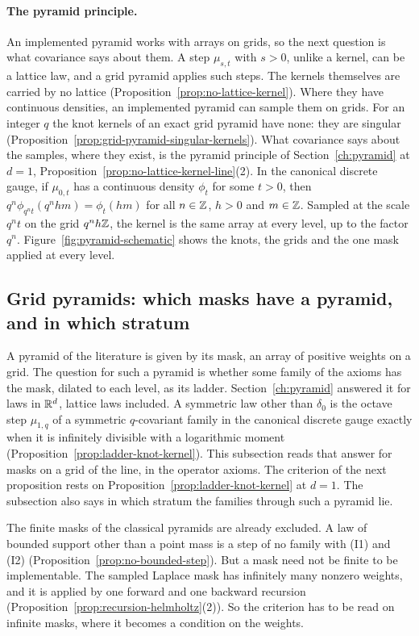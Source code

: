 \paragraph{The pyramid principle.} An implemented pyramid works with arrays on grids, so the next
question is what covariance says about them. A step $\mu_{s,t}$ with $s > 0$, unlike a kernel, can
be a lattice law, and a grid pyramid applies such steps. The kernels themselves are carried by no
lattice (Proposition~\ref{prop:no-lattice-kernel}). Where they have continuous densities, an
implemented pyramid can sample them on grids. For an integer $q$ the knot kernels of an exact grid
pyramid have none: they are singular (Proposition~\ref{prop:grid-pyramid-singular-kernels}).
What covariance says about the samples, where they exist, is the pyramid principle of
Section~\ref{ch:pyramid} at $d = 1$, Proposition~\ref{prop:no-lattice-kernel-line}(2). In the canonical discrete gauge, if $\mu_{0,t}$
has a continuous density $\phi_t$ for some $t > 0$, then $q^n\phi_{q^nt}(q^nhm) = \phi_t(hm)$ for
all $n \in \mathbb{Z}$, $h > 0$ and $m \in \mathbb{Z}$. Sampled at the scale $q^nt$ on the grid $q^nh\mathbb{Z}$, the
kernel is the same array at every level, up to the factor $q^n$.
Figure~\ref{fig:pyramid-schematic} shows the knots, the grids and the one mask applied at every
level.

\subsection{Grid pyramids: which masks have a pyramid, and in which stratum}
\label{subsec:grid-pyramids-line}

A pyramid of the literature is given by its mask, an array of positive weights on a grid. The
question for such a pyramid is whether some family of the axioms has the mask, dilated to each
level, as its ladder. Section~\ref{ch:pyramid} answered it for laws in $\mathbb{R}^d$, lattice laws
included. A symmetric law other than $\delta_0$ is the octave step $\mu_{1,q}$ of a symmetric
$q$-covariant family in the canonical discrete gauge exactly when it is infinitely divisible with a
logarithmic moment (Proposition~\ref{prop:ladder-knot-kernel}). This subsection reads that answer
for masks on a grid of the line, in the operator axioms. The criterion of the next proposition
rests on Proposition~\ref{prop:ladder-knot-kernel} at $d = 1$. The subsection also says in which
stratum the families through such a pyramid lie.

The finite masks of the classical pyramids are already excluded. A law of bounded support other
than a point mass is a step of no family with (I1) and (I2)
(Proposition~\ref{prop:no-bounded-step}). But a mask need not be finite to be implementable. The
sampled Laplace mask has infinitely many nonzero weights, and it is applied by one forward and one
backward recursion (Proposition~\ref{prop:recursion-helmholtz}(2)). So the criterion has to be read
on infinite masks, where it becomes a condition on the weights.

